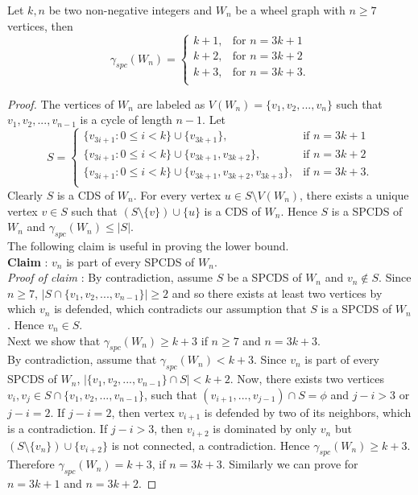 \begin{proposition}
Let $k,n$ be two non-negative integers and $W_n$ be a wheel graph with $n \geq 7$ vertices, then
\[
\gamma_{spc}(W_n) = \begin{cases}
k+1, & \text{for }n=3k+1 \\
k+2, & \text{for }n=3k+2 \\
k+3, & \text{for }n=3k+3. \\
\end{cases} 
\]
\end{proposition}
\begin{proof}
The vertices of $W_n$ are labeled as $V(W_n)= \{ v_1, v_2,...,v_n\}$ such that $v_1, v_2,...,v_{n-1}$ is a cycle of length $n-1$. Let
\[
S = \begin{cases}
\lbrace v_{3i+1}:0\leq i < k \rbrace \cup \lbrace v_{3k+1} \rbrace, & \text{if }n=3k+1 \\
\lbrace v_{3i+1}:0\leq i < k \rbrace \cup \lbrace v_{3k+1},v_{3k+2} \rbrace, & \text{if }n=3k+2 \\
\lbrace v_{3i+1}:0\leq i < k \rbrace \cup \lbrace v_{3k+1},v_{3k+2},v_{3k+3} \rbrace, & \text{if }n=3k+3. \\
\end{cases} 
\]
Clearly $S$ is a CDS of $W_n$. For every vertex $u \in S \setminus V(W_n)$, there exists a unique vertex $v \in S$ such that $(S \setminus \lbrace v \rbrace) \cup \lbrace u \rbrace$ is a CDS of $W_n$. Hence $S$ is a SPCDS of $W_n$ and $\gamma_{spc}(W_n) \leq |S|$.\\
The following claim is useful in proving the lower bound.\\
\textbf{Claim} : $v_n$ is part of every SPCDS of $W_n$.\\
\textit{Proof of claim} : By contradiction, assume $S$ be a SPCDS of $W_n$ and $v_n \notin S$. Since $n \geq 7$, $|S \cap \lbrace v_1, v_2, ... , v_{n-1} \rbrace | \geq 2$ and so there exists at least two vertices by which $v_n$ is defended, which contradicts our assumption that $S$ is a SPCDS of $W_n$. Hence $v_n \in S$. \\
Next we show that $\gamma_{spc}(W_n) \geq k+3$ if $n \geq 7 $ and $n=3k+3$. \\
By contradiction, assume that $\gamma_{spc}(W_n) < k+3$. Since $v_n$ is part of every SPCDS of $W_n$, $| \lbrace v_1,v_2,...,v_{n-1} \rbrace \cap S | < k+2$. Now, there exists two vertices $v_i,v_j \in S \cap \lbrace v_1,v_2,..., v_{n-1} \rbrace $, such that $( v_{i+1},...,v_{j-1}) \cap S = \phi$ and $j-i > 3$ or $j-i=2$. If $j-i=2$, then vertex $v_{i+1}$ is defended by two of its neighbors, which is a contradiction. If $j-i > 3$, then $ v_{i+2}$ is dominated by only $v_n$ but $(S\setminus \lbrace v_n \rbrace) \cup \lbrace v_{i+2} \rbrace$ is not connected, a contradiction. Hence $\gamma_{spc}(W_n) \geq k+3$. Therefore $\gamma_{spc}(W_n) = k+3$, if $n=3k+3$. Similarly we can prove for $n=3k+1$ and $n=3k+2$.
\end{proof}


